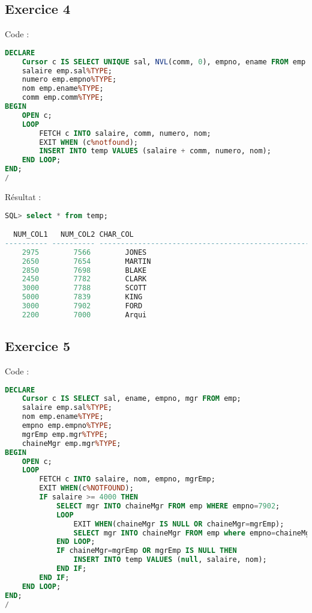 \documentclass{article}
\begin{document}
\subsection{Exercice 4}
Code :
\begin{lstlisting}[language=SQL,
    deletekeywords={char},
    morekeywords={DECLARE, LOOP, TYPE, FOR, IF, IS, OPEN, FETCH, DBMS_OUTPUT, PUT_LINE}]
DECLARE
    Cursor c IS SELECT UNIQUE sal, NVL(comm, 0), empno, ename FROM emp WHERE sal + NVL(comm, 0) > 2000;
    salaire emp.sal%TYPE;
    numero emp.empno%TYPE;
    nom emp.ename%TYPE;
    comm emp.comm%TYPE;
BEGIN
	OPEN c;
	LOOP
		FETCH c INTO salaire, comm, numero, nom;
		EXIT WHEN (c%notfound);
		INSERT INTO temp VALUES (salaire + comm, numero, nom);
	END LOOP;
END;
/
\end{lstlisting}

Résultat :
\begin{lstlisting}[language=SQL,
    morekeywords={DECLARE, LOOP, TYPE, FOR, IF, IS, OPEN, FETCH, DBMS_OUTPUT, PUT_LINE}]
SQL> select * from temp;

  NUM_COL1   NUM_COL2 CHAR_COL
---------- ---------- -------------------------------------------------------
    2975	    7566        JONES
    2650	    7654        MARTIN
    2850	    7698        BLAKE
    2450	    7782        CLARK
    3000	    7788        SCOTT
    5000	    7839        KING
    3000	    7902        FORD
    2200	    7000        Arqui
\end{lstlisting}

\subsection{Exercice 5}
Code :
\begin{lstlisting}[language=SQL,
    deletekeywords={char},
    morekeywords={DECLARE, LOOP, TYPE, FOR, IF, IS, OPEN, FETCH, DBMS_OUTPUT, PUT_LINE}]
DECLARE
	Cursor c IS SELECT sal, ename, empno, mgr FROM emp;
	salaire emp.sal%TYPE;
	nom emp.ename%TYPE;
	empno emp.empno%TYPE;
	mgrEmp emp.mgr%TYPE;
	chaineMgr emp.mgr%TYPE;
BEGIN
	OPEN c;
	LOOP
		FETCH c INTO salaire, nom, empno, mgrEmp;
		EXIT WHEN(c%NOTFOUND);
		IF salaire >= 4000 THEN
			SELECT mgr INTO chaineMgr FROM emp WHERE empno=7902;
			LOOP
				EXIT WHEN(chaineMgr IS NULL OR chaineMgr=mgrEmp);
				SELECT mgr INTO chaineMgr FROM emp where empno=chaineMgr;
			END LOOP;
			IF chaineMgr=mgrEmp OR mgrEmp IS NULL THEN
				INSERT INTO temp VALUES (null, salaire, nom);
			END IF;
		END IF;
	END LOOP;
END;
/
\end{lstlisting}
\end{document}
